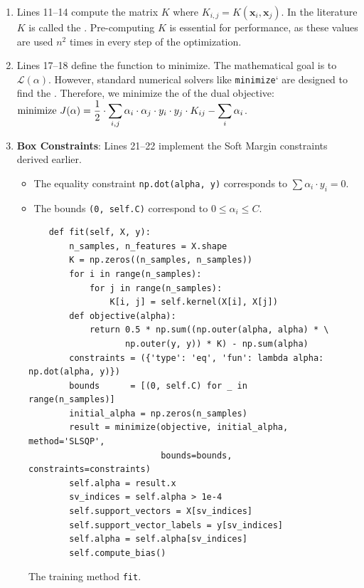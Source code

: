 \begin{enumerate}
\item Lines 11--14 compute the matrix $K$ where $K_{i,j} = K(\mathbf{x}_i, \mathbf{x}_j)$.
      In the literature $K$ is called the .
      Pre-computing $K$ is essential for performance, as these values are used $n^2$ times in every step of the
      optimization. 
\item Lines 17--18 define the function to minimize.
      The mathematical goal is to  $\mathcal{L}(\alpha)$.
      However, standard numerical solvers like \texttt{minimize}` are designed to find the . Therefore, we minimize the  of the dual objective:
    \\[0.2cm]
    \hspace*{1.3cm}
    $\displaystyle \text{minimize } J(\alpha) = \frac{1}{2} \cdot \sum_{i,j} \alpha_i \cdot\alpha_j \cdot y_i \cdot y_j \cdot K_{ij} - \sum_i \alpha_i$.
    
    \item \textbf{Box Constraints}: Lines 21--22 implement the Soft Margin constraints derived earlier.
    \begin{itemize}
        \item The equality constraint \texttt{np.dot(alpha, y)} corresponds to $\sum \alpha_i \cdot y_i = 0$.
        \item The bounds \texttt{(0, self.C)} correspond to $0 \leq \alpha_i \leq C$.
    \end{itemize}
\end{enumerate}

\begin{figure}[!ht]
\centering
\begin{verbatim}
    def fit(self, X, y):
        n_samples, n_features = X.shape
        K = np.zeros((n_samples, n_samples))
        for i in range(n_samples):
            for j in range(n_samples):
                K[i, j] = self.kernel(X[i], X[j])
        def objective(alpha):
            return 0.5 * np.sum((np.outer(alpha, alpha) * \
                   np.outer(y, y)) * K) - np.sum(alpha)
        constraints = ({'type': 'eq', 'fun': lambda alpha: np.dot(alpha, y)})
        bounds      = [(0, self.C) for _ in range(n_samples)]
        initial_alpha = np.zeros(n_samples)
        result = minimize(objective, initial_alpha, method='SLSQP', 
                          bounds=bounds, constraints=constraints)
        self.alpha = result.x
        sv_indices = self.alpha > 1e-4
        self.support_vectors = X[sv_indices]
        self.support_vector_labels = y[sv_indices]
        self.alpha = self.alpha[sv_indices]
        self.compute_bias()
\end{verbatim}
\caption{The training method \texttt{fit}.}
\label{fig:svm_fit}
\end{figure}

